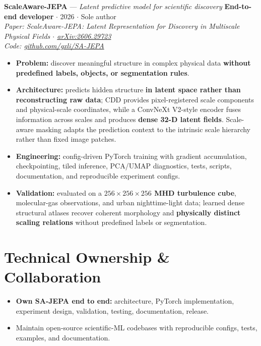 \documentclass[10pt]{article}
\begin{document}
\textbf{ScaleAware-JEPA} --- \textit{Latent predictive model for scientific discovery}
\hfill{\footnotesize\color{contactgray!70} \textbf{End-to-end developer} $\cdot$ 2026 $\cdot$ Sole author}\\[2pt]
{\fontsize{6.5}{7.8}\selectfont\color{contactgray!50}\itshape Paper: ScaleAware-JEPA: Latent Representation for
Discovery in Multiscale Physical Fields $\cdot$
\href{https://arxiv.org/abs/2606.29723}{arXiv:2606.29723}\\
Code: \href{https://github.com/gxli/SA-JEPA}{github.com/gxli/SA-JEPA}}
\begin{itemize}
  \item \textbf{Problem:} discover meaningful structure in complex physical data \textbf{without
        predefined labels, objects, or segmentation rules}.
  \item \textbf{Architecture:} predicts hidden structure \textbf{in latent space rather than
        reconstructing raw data}; CDD provides pixel-registered scale components and
        physical-scale coordinates, while a ConvNeXt V2-style encoder fuses information across
        scales and produces \textbf{dense 32-D latent fields}. Scale-aware masking adapts the
        prediction context to the intrinsic scale hierarchy rather than fixed image patches.
  \item \textbf{Engineering:} config-driven PyTorch training with gradient accumulation,
        checkpointing, tiled inference, PCA/UMAP diagnostics, tests, scripts, documentation, and
        reproducible experiment configs.
  \item \textbf{Validation:} evaluated on a \textbf{$256\times 256\times 256$ MHD turbulence cube},
        molecular-gas observations, and urban nighttime-light data; learned dense structural atlases
        recover coherent morphology and \textbf{physically distinct scaling relations} without
        predefined labels or segmentation.
\end{itemize}

\section*{Technical Ownership \& Collaboration}
\begin{itemize}
  \item \textbf{Own SA-JEPA end to end:} architecture, PyTorch implementation, experiment design,
        validation, testing, documentation, release.
  \item Maintain open-source scientific-ML codebases with reproducible configs, tests, examples,
        and documentation.
\end{itemize}
\end{document}

